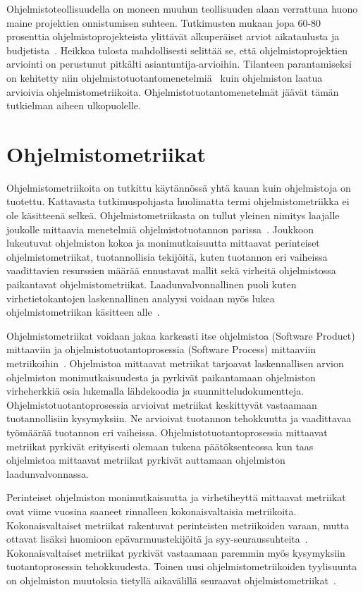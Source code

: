\documentclass[finnish]{tktltiki2}
\theoremstyle{definition}
\theoremstyle{remark}
\begin{document}
Ohjelmistoteollisuudella on moneen muuhun teollisuuden alaan verrattuna huono maine projektien onnistumisen suhteen. Tutkimusten mukaan jopa 60-80 prosenttia ohjelmistoprojekteista ylittävät alkuperäiset arviot aikataulusta ja budjetista~\cite{MJ03}. Heikkoa tulosta mahdollisesti selittää se, että ohjelmistoprojektien arviointi on perustunut pitkälti asiantuntija-arvioihin. Tilanteen parantamiseksi on kehitetty niin ohjelmistotuotantomenetelmiä~\cite{BBB00} kuin ohjelmiston laatua arvioivia ohjelmistometriikoita. Ohjelmistotuotantomenetelmät jäävät tämän tutkielman aiheen ulkopuolelle.

\section{Ohjelmistometriikat}

Ohjelmistometriikoita on tutkittu käytännössä yhtä kauan kuin ohjelmistoja on tuotettu. Kattavasta tutkimuspohjasta huolimatta termi ohjelmistometriikka ei ole käsitteenä selkeä. Ohjelmistometriikasta on tullut yleinen nimitys laajalle joukolle mittaavia menetelmiä ohjelmistotuotannon parissa~\cite{FM00}. Joukkoon lukeutuvat ohjelmiston kokoa ja monimutkaisuutta mittaavat perinteiset ohjelmistometriikat, tuotannollisia tekijöitä, kuten tuotannon eri vaiheissa vaadittavien resurssien määrää ennustavat mallit sekä virheitä ohjelmistossa paikantavat ohjelmistometriikat. Laadunvalvonnallinen puoli kuten virhetietokantojen laskennallinen analyysi voidaan myös lukea ohjelmistometriikan käsitteen alle~\cite{FN99-2}.

Ohjelmistometriikat voidaan jakaa karkeasti itse ohjelmistoa (Software Product) mittaaviin ja ohjelmistotuotantoprosessia (Software Process) mittaaviin metriikoihin~\cite{LH93}. Ohjelmistoa mittaavat metriikat tarjoavat laskennallisen arvion ohjelmiston monimutkaisuudesta ja pyrkivät paikantamaan ohjelmiston virheherkkiä osia lukemalla lähdekoodia ja suunnitteludokumentteja. Ohjelmistotuotantoprosessia arvioivat metriikat keskittyvät vastaamaan tuotannollisiin kysymyksiin. Ne arvioivat tuotannon tehokkuutta ja vaadittavaa työmäärää tuotannon eri vaiheissa. Ohjelmistotuotantoprosessia mittaavat metriikat pyrkivät erityisesti olemaan tukena päätöksenteossa kun taas ohjelmistoa mittaavat metriikat pyrkivät auttamaan ohjelmiston laadunvalvonnassa.

Perinteiset ohjelmiston monimutkaisuutta ja virhetiheyttä mittaavat metriikat ovat viime vuosina saaneet rinnalleen kokonaisvaltaisia metriikoita. Kokonaisvaltaiset metriikat rakentuvat perinteisten metriikoiden varaan, mutta ottavat lisäksi huomioon epävarmuustekijöitä ja syy-seuraussuhteita~\cite{FNMHMKM07}. Kokonaisvaltaiset metriikat pyrkivät vastaamaan paremmin myös kysymyksiin tuotantoprosessin tehokkuudesta. Toinen uusi ohjelmistometriikoiden tyylisuunta on ohjelmiston muutoksia tietyllä aikavälillä seuraavat ohjelmistometriikat~\cite{NB05, ME98, KZWZ07}.
\end{document}
